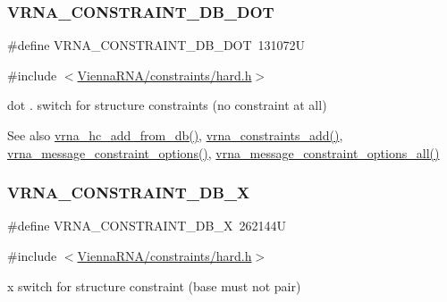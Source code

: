 \subsubsection{\texorpdfstring{VRNA\_CONSTRAINT\_DB\_DOT}{VRNA\_CONSTRAINT\_DB\_DOT}}
{\footnotesize\ttfamily \#define V\+R\+N\+A\+\_\+\+C\+O\+N\+S\+T\+R\+A\+I\+N\+T\+\_\+\+D\+B\+\_\+\+D\+OT~131072U}



{\ttfamily \#include $<$\mbox{\hyperlink{hard_8h}{Vienna\+R\+N\+A/constraints/hard.\+h}}$>$}



dot \textquotesingle{}.\textquotesingle{} switch for structure constraints (no constraint at all) 

\begin{DoxySeeAlso}{See also}
\mbox{\hyperlink{group__hard__constraints_ga5b4de3247b67358080c176b94591a8e6}{vrna\+\_\+hc\+\_\+add\+\_\+from\+\_\+db()}}, \mbox{\hyperlink{group__constraints_ga35a401f680969a556858a8dd5f1d07cc}{vrna\+\_\+constraints\+\_\+add()}}, \mbox{\hyperlink{group__constraints_gaa1f20b53bf09ac2e6b0dbb13f7d89670}{vrna\+\_\+message\+\_\+constraint\+\_\+options()}}, \mbox{\hyperlink{group__constraints_gaec7e13fa0465c2acc7a621d1aecb709f}{vrna\+\_\+message\+\_\+constraint\+\_\+options\+\_\+all()}} 
\end{DoxySeeAlso}
\mbox{\label{group__hard__constraints_ga7283bbe0f8954f7b030ecc3f2d1932b2}} 
\subsubsection{\texorpdfstring{VRNA\_CONSTRAINT\_DB\_X}{VRNA\_CONSTRAINT\_DB\_X}}
{\footnotesize\ttfamily \#define V\+R\+N\+A\+\_\+\+C\+O\+N\+S\+T\+R\+A\+I\+N\+T\+\_\+\+D\+B\+\_\+X~262144U}



{\ttfamily \#include $<$\mbox{\hyperlink{hard_8h}{Vienna\+R\+N\+A/constraints/hard.\+h}}$>$}



\textquotesingle{}x\textquotesingle{} switch for structure constraint (base must not pair) 

